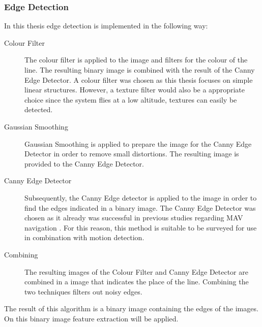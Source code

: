 \documentclass[a4paper]{article}
\begin{document}
\subsubsection{Edge Detection}
In this thesis edge detection is implemented in the following way:
\begin{description}
\item[Colour Filter] The colour filter is applied to the image and filters for the colour of the line. The resulting binary image is combined with the result of the Canny Edge Detector. A colour filter was chosen as this thesis focuses on simple linear structures. However, a texture filter would also be a appropriate choice since the system flies at a low altitude, textures can easily be detected.
\item[Gaussian Smoothing] Gaussian Smoothing is applied to prepare the image for the Canny Edge Detector in order to remove small distortions. The resulting image is provided to the Canny Edge Detector.
\item[Canny Edge Detector] Subsequently, the Canny Edge detector is applied to the image in order to find the edges indicated in a binary image. The Canny Edge Detector was chosen as it already was successful in previous studies regarding MAV navigation \cite{Bills2011}. For this reason, this method is suitable to be surveyed for use in combination with motion detection.
\item[Combining] The resulting images of the Colour Filter and Canny Edge Detector are combined in a image that indicates the place of the line. Combining the two techniques filters out noisy edges.
\end{description}
The result of this algorithm is a binary image containing the edges of the images. On this binary image feature extraction will be applied.
\end{document}

